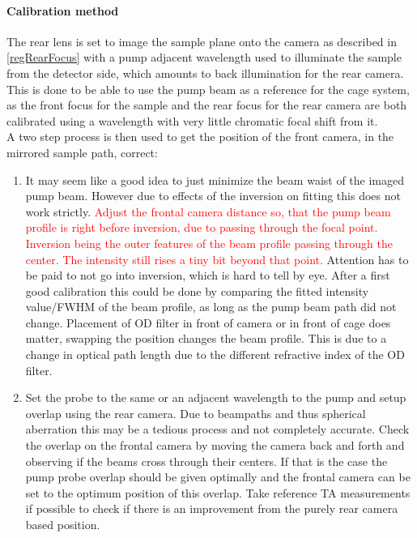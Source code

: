\documentclass[twoside,openright]{scrreprt}
\begin{document}
\paragraph{Calibration method}
The rear lens is set to image the sample plane onto the camera as described in \ref{regRearFocus} with a pump adjacent wavelength used to illuminate the sample from the detector side, which amounts to back illumination for the rear camera. This is done to be able to use the pump beam as a reference for the cage system, as the front focus for the sample and the rear focus for the rear camera are both calibrated using a wavelength with very little chromatic focal shift from it.\\
A two step process is then used to get the position of the front camera, in the mirrored sample path, correct:
\begin{enumerate}
\item It may seem like a good idea to just minimize the beam waist of the imaged pump beam. However due to effects of the inversion on fitting this does not work strictly. \textcolor{red}{Adjust the frontal camera distance so, that the pump beam profile is right before inversion, due to passing through the focal point. Inversion being the outer features of the beam profile passing through the center. The intensity still rises a tiny bit beyond that point.} Attention has to be paid to not go into inversion, which is hard to tell by eye. After a first good calibration this could be done by comparing the fitted intensity value/FWHM of the beam profile, as long as the pump beam path did not change. Placement of OD filter in front of camera or in front of cage does matter, swapping the position changes the beam profile. This is due to a change in optical path length due to the different refractive index of the OD filter.
\item Set the probe to the same or an adjacent wavelength to the pump and setup overlap using the rear camera. Due to beampaths and thus spherical aberration this may be a tedious process and not completely accurate. Check the overlap on the frontal camera by moving the camera back and forth and observing if the beams cross through their centers. If that is the case the pump probe overlap should be given optimally and the frontal camera can be set to the optimum position of this overlap. Take reference TA measurements if possible to check if there is an improvement from the purely rear camera based position.
\end{enumerate}
\end{document}
